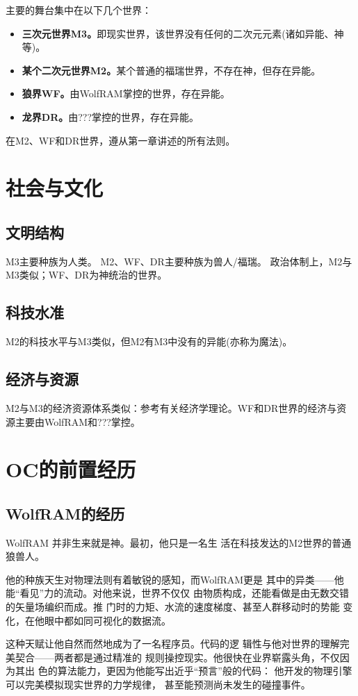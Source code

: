 \documentclass[lang=cn,newtx,10pt,scheme=chinese]{elegantbook}
\newcommand{\wf}{WolfRAM}
\newcommand{\dr}{???}
\begin{document}
主要的舞台集中在以下几个世界：
\begin{itemize}
    \item \textbf{三次元世界M3。}即现实世界，该世界没有任何的二次元元素(诸如异能、神等)。
    \item \textbf{某个二次元世界M2。}某个普通的福瑞世界，不存在神，但存在异能。
    \item \textbf{狼界WF。}由\wf{}掌控的世界，存在异能。
    \item \textbf{龙界DR。}由\dr{}掌控的世界，存在异能。
\end{itemize}

在M2、WF和DR世界，遵从第一章讲述的所有法则。

\section{社会与文化}
\subsection{文明结构}
M3主要种族为人类。
M2、WF、DR主要种族为兽人/福瑞。
政治体制上，M2与M3类似；WF、DR为神统治的世界。

\subsection{科技水准}
M2的科技水平与M3类似，但M2有M3中没有的异能(亦称为魔法)。

\subsection{经济与资源}
M2与M3的经济资源体系类似：参考有关经济学理论。WF和DR世界的经济与资源主要由\wf{}和\dr{}掌控。

\section{OC的前置经历}
\subsection{\wf{}的经历}
\wf{} 并非生来就是神。最初，他只是一名生
活在科技发达的M2世界的普通狼兽人。

他的种族天生对物理法则有着敏锐的感知，而\wf{}更是
其中的异类——他能“看见”力的流动。对他来说，世界不仅仅
由物质构成，还能看做是由无数交错的矢量场编织而成。推
门时的力矩、水流的速度梯度、甚至人群移动时的势能
变化，在他眼中都如同可视化的数据流。

这种天赋让他自然而然地成为了一名程序员。代码的逻
辑性与他对世界的理解完美契合——两者都是通过精准的
规则操控现实。他很快在业界崭露头角，不仅因为其出
色的算法能力，更因为他能写出近乎“预言”般的代码：
他开发的物理引擎可以完美模拟现实世界的力学规律，
甚至能预测尚未发生的碰撞事件。
\end{document}
